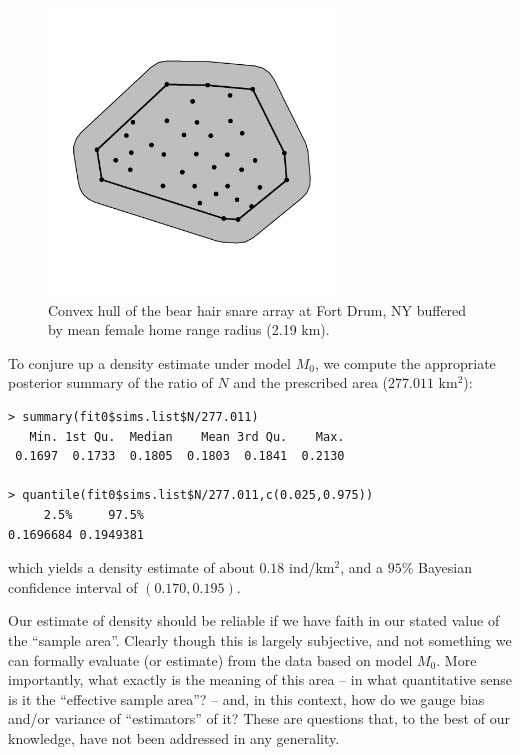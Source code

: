 \begin{figure}[ht]
\begin{center}
\includegraphics[height=3in,width=3in]{Ch4-Closed/figs/bufferedCH}
\end{center}
\caption{Convex hull of the bear hair snare array at Fort Drum, NY buffered by mean female
home range radius (2.19 km).}
\label{closed.fig.bch}
\end{figure}

To conjure up a
density estimate under model $M_0$, we compute the appropriate
posterior summary of the ratio of $N$ and the prescribed area ($277.011$ km$^2$):
{\small
\begin{verbatim}
> summary(fit0$sims.list$N/277.011)
   Min. 1st Qu.  Median    Mean 3rd Qu.    Max.
 0.1697  0.1733  0.1805  0.1803  0.1841  0.2130

> quantile(fit0$sims.list$N/277.011,c(0.025,0.975))
     2.5%     97.5%
0.1696684 0.1949381
\end{verbatim}
}
{\flushleft which } yields a density estimate of about $0.18$ ind/km$^2$, and a $95\%$ Bayesian
confidence interval of $(0.170, 0.195)$.

Our estimate of density should be reliable if we have faith in our
stated value of the ``sample area''. Clearly though this is largely
subjective, and not something we can formally evaluate (or estimate)
from the data based on model $M_{0}$.  More importantly, what exactly is the meaning of this
area -- in what quantitative sense is it the ``effective sample
area''? -- and, in this context, how do we gauge bias and/or variance
of ``estimators'' of it? These are questions that, to the best of our
knowledge, have not been addressed in any generality.

